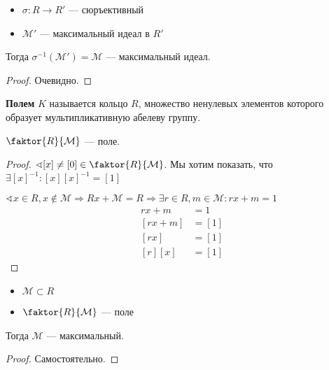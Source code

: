 \begin{lemma}\itemfix
    \begin{itemize}
        \item \(\sigma : R \to R'\) --- сюръективный
        \item \(\mathcal{M}'\) --- максимальный идеал в \(R'\)
    \end{itemize}
    Тогда \(\sigma^{-1}(\mathcal{M}') = \mathcal{M}\) --- максимальный идеал.
\end{lemma}
\begin{proof}
    Очевидно.
\end{proof}

\begin{definition}
    \textbf{Полем} \(K\) называется кольцо \(R\), множество ненулевых элементов которого образует мультипликативную абелеву группу.
\end{definition}

\begin{lemma}
    \(\faktor{R}{\mathcal{M}}\) --- поле.
\end{lemma}
\begin{proof}
    \(\sphericalangle [x] \neq [0] \in \faktor{R}{\mathcal{M}}\). Мы хотим показать, что \(\exists [x]^{-1} : [x][x]^{-1} = [1]\)

    \(\sphericalangle x \in R, x \notin \mathcal{M} \Rightarrow Rx + \mathcal{M} = R \Rightarrow \exists r \in R, m \in \mathcal{M} : rx + m = 1\)
    \begin{align*}
        rx + m   & = 1   \\
        [rx + m] & = [1] \\
        [rx]     & = [1] \\
        [r][x]   & = [1]
    \end{align*}
\end{proof}

\begin{lemma}\itemfix
    \begin{itemize}
        \item \(\mathcal{M} \subset R\)
        \item \(\faktor{R}{\mathcal{M}}\) --- поле
    \end{itemize}

    Тогда \(\mathcal{M}\) --- максимальный.
\end{lemma}
\begin{proof}
    Самостоятельно.
\end{proof}
